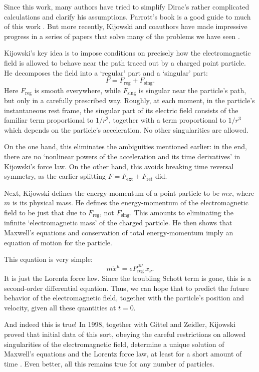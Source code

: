 \documentclass[12pt]{article}
\newcommand{\ret}{\mathrm{ret}}
\newcommand{\ext}{\mathrm{ext}}
\newcommand{\sing}{\mathrm{sing}}
\newcommand{\reg}{\mathrm{reg}}
\begin{document}
Since this work, many authors have tried to simplify Dirac's rather complicated calculations 
and clarify his assumptions.  Parrott's book is a good guide to much of this work 
\cite{Parrott}.  But more recently, Kijowski and coauthors have made impressive progress in a series of papers that solve many of the problems we have seen \cite{GKZ1998,Kijowski1994a,Kijowski1994b,KP2003,KP2007}.

Kijowski's key idea is to impose conditions on precisely how the electromagnetic
field is allowed to behave near the path traced out by a charged point particle.  He decomposes the field into a `regular' part and a `singular' part:
\[            F = F_\reg + F_\sing . \]
Here $F_\reg$ is smooth everywhere, while $F_\sing$ is singular near the particle's
path, but only in a carefully prescribed way.   Roughly, at each moment, in the particle's instantaneous rest frame, the singular part of its electric field consists of the familiar
term proportional to $1/r^2$, together with a term proportional to $1/r^3$ which depends on the particle's acceleration.  No other singularities are allowed. 

On the one hand, this eliminates the ambiguities mentioned earlier: in the end, there are no `nonlinear powers of the acceleration and its time derivatives' in Kijowski's force law.  On the other hand, this avoids breaking time reversal symmetry, as the earlier splitting $F = F_\ext + F_\ret$ did.  

Next, Kijowski defines the energy-momentum of a point particle to be $m \dot{x}$,
where $m$ is its physical mass.   He defines the energy-momentum of the electromagnetic field to be just that due to $F_\reg$, not $F_\sing$.   This amounts to eliminating the infinite `electromagnetic mass' of the charged particle. He then shows that Maxwell's equations and conservation of total energy-momentum imply an equation of motion for the particle.

This equation is very simple:
\[    m \ddot{x}^\mu = e F_{\reg}^{\mu \nu} \,\dot{x}_\nu  . \]
It is just the Lorentz force law.    Since the troubling Schott term is gone,
this is a second-order differential equation.  Thus, we can hope that to predict the future behavior of the electromagnetic field, together with the particle's position and velocity, given all these quantities at $t = 0$.  

And indeed this is true!  In 1998, together with Gittel and Zeidler, Kijowski proved that initial data of this sort, obeying the careful restrictions on allowed singularities of the electromagnetic field, determine a unique solution of Maxwell's equations and the Lorentz force law, at least for a short amount of time \cite{GKZ1998}.   Even better, all this remains true for any number of particles.
\end{document}
